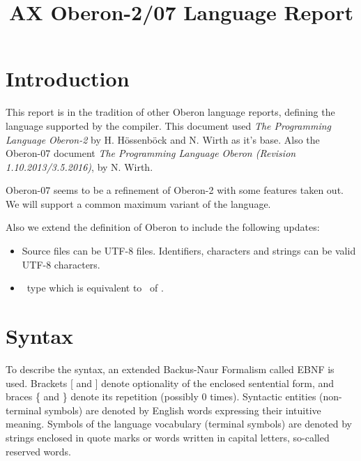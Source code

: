 \documentclass[12pt]{article}
\title{AX Oberon-2/07 Language Report}
\begin{document}
    
\maketitle


\tableofcontents

\section{Introduction}

This report is in the tradition of other Oberon language reports, defining the language supported by the compiler. This document used {\em The Programming Language Oberon-2} by H. Hössenböck and N. Wirth as it's base. Also the Oberon-07 document {\em The Programming Language Oberon (Revision 1.10.2013/3.5.2016)}, by N. Wirth.

Oberon-07 seems to be a refinement of Oberon-2 with some features taken out. We will support a common maximum variant of the language.

Also we extend the definition of Oberon to include the following updates:
\begin{itemize}
    \item Source files can be UTF-8 files. Identifiers, characters and strings can be valid UTF-8 characters.
    \item \STRING\ type which is equivalent to \ARRAY\ of \CHAR.
\end{itemize}

\section{Syntax}

To describe the syntax, an extended Backus-Naur Formalism called EBNF is used. Brackets [ and ] denote optionality of the enclosed sentential form, and braces \{ and \} denote its repetition (possibly 0 times). Syntactic entities (non-terminal symbols) are denoted by English words expressing their intuitive meaning. Symbols of the language vocabulary (terminal symbols) are denoted by strings enclosed in quote marks or words written in capital letters, so-called reserved words.

\end{document}
